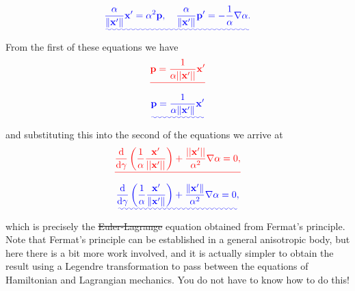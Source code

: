 \documentclass[a4paper,10pt]{paper}
\providecommand{\DIFadd}[1]{{\protect\color{blue}\uwave{#1}}} %
\providecommand{\DIFdel}[1]{{\protect\color{red}\sout{#1}}}                      %
\providecommand{\DIFaddbegin}{} %
\providecommand{\DIFaddend}{} %
\providecommand{\DIFdelbegin}{} %
\providecommand{\DIFdelend}{} %
\begin{document}
\begin{enumerate}
\begin{equation*}
    \DIFadd{\frac{\alpha}{\|\mathbf{x}'\|}\mathbf{x}'=\alpha^{2}\mathbf{p}, \quad \frac{\alpha}{\|\mathbf{x}'\|}\mathbf{p}'=-\frac{1}{\alpha}\nabla\alpha.
}\end{equation*}\DIFaddend 
From the first of these equations we have
\DIFdelbegin \begin{displaymath}
    \DIFdel{\mathbf{p}=\frac{1}{\alpha||\mathbf{x}'||}\mathbf{x}'
}\end{displaymath}%
\DIFdelend \DIFaddbegin \begin{equation*}
    \DIFadd{\mathbf{p}=\frac{1}{\alpha\|\mathbf{x}'\|}\mathbf{x}'
}\end{equation*}\DIFaddend 
and substituting this into the second of the equations we arrive at
\DIFdelbegin \begin{displaymath}
    \DIFdel{\frac{\ddns}{\ddns\gamma}\left(\frac{1}{\alpha}\frac{\mathbf{x}'}{||\mathbf{x}'||}\right)+\frac{||\mathbf{x}'||}{\alpha^{2}}\nabla\alpha=0,
}\end{displaymath}%
\DIFdelend \DIFaddbegin \begin{equation*}
    \DIFadd{\frac{\ddns}{\ddns\gamma}\left(\frac{1}{\alpha}\frac{\mathbf{x}'}{\|\mathbf{x}'\|}\right)+\frac{\|\mathbf{x}'\|}{\alpha^{2}}\nabla\alpha=0,
}\end{equation*}\DIFaddend 
which is precisely the \DIFdelbegin \DIFdel{Euler-Lagrange }\DIFdelend \DIFaddbegin \DIFadd{Euler--Lagrange }\DIFaddend equation obtained from Fermat's principle. Note that Fermat's principle can be established in a general anisotropic body, but here there is a bit more work involved, and it is actually simpler to obtain the result using a Legendre transformation to pass between the equations of Hamiltonian and Lagrangian mechanics. You do not have to know how to do this!




\end{enumerate}
\end{document}
